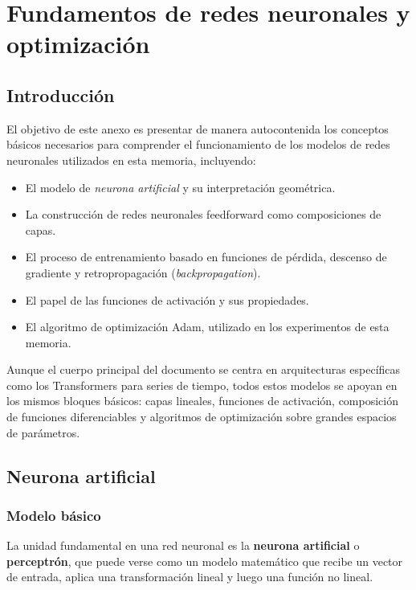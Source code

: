 \chapter{Fundamentos de redes neuronales y optimización}
\label{anexo:fundamentos-redes}

\section{Introducción}

El objetivo de este anexo es presentar de manera autocontenida los conceptos básicos necesarios para comprender el funcionamiento de los modelos de redes neuronales utilizados en esta memoria, incluyendo:

\begin{itemize}
    \item El modelo de \emph{neurona artificial} y su interpretación geométrica.
    \item La construcción de redes neuronales feedforward como composiciones de capas.
    \item El proceso de entrenamiento basado en funciones de pérdida, descenso de gradiente y retropropagación (\textit{backpropagation}).
    \item El papel de las funciones de activación y sus propiedades.
    \item El algoritmo de optimización Adam, utilizado en los experimentos de esta memoria.
\end{itemize}

Aunque el cuerpo principal del documento se centra en arquitecturas específicas como los Transformers para series de tiempo, todos estos modelos se apoyan en los mismos bloques básicos: capas lineales, funciones de activación, composición de funciones diferenciables y algoritmos de optimización sobre grandes espacios de parámetros.

\section{Neurona artificial}

\subsection{Modelo básico}

La unidad fundamental en una red neuronal es la \textbf{neurona artificial} o \textbf{perceptrón}, que puede verse como un modelo matemático que recibe un vector de entrada, aplica una transformación lineal y luego una función no lineal.

